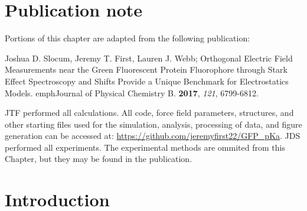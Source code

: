 \section{Publication note} \label{pKa-pub-note}

Portions of this chapter are adapted from the following publication: 

\noindent Joshua D. Slocum, Jeremy T. First, Lauren J. Webb; Orthogonal Electric Field Measurements near the Green Fluorescent Protein Fluorophore through Stark Effect Spectroscopy and \pKa{} Shifts Provide a Unique Benchmark for Electrostatics Models. emph{Journal of Physical Chemistry B}. \textbf{2017}, \emph{121}, 6799-6812.

JTF performed all calculations. 
All code, force field parameters, structures, and other starting files used for the simulation, analysis, processing of data, and figure generation can be accessed at:
\url{https://github.com/jeremyfirst22/GFP_pKa}. 
JDS performed all experiments. The experimental methods are ommited from this Chapter, but they may be found in the publication. 

\section{Introduction} \label{pKa-intro}

